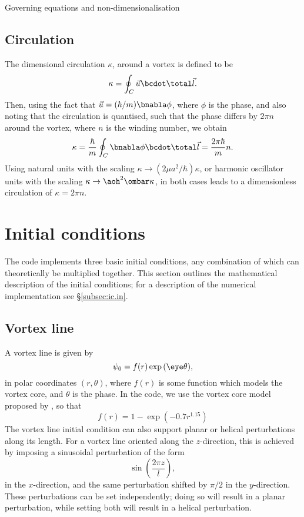 \begin{chapter}{\label{cha:equations}Governing equations and
  non-dimensionalisation}
  \subsection{Circulation}
  The dimensional circulation $\kappa$, around a vortex is defined to be
  \begin{equation*}
    \kappa = \oint_{C}{\vec{u}\bcdot\total\vec{l}}.
  \end{equation*}
  Then, using the fact that $\vec{u} = (\hbar/m)\bnabla\phi$, where $\phi$ is
  the phase, and also noting that the circulation is quantised, such that the
  phase differs by $2\pi n$ around the vortex, where $n$ is the winding number,
  we obtain
  \begin{equation*}
    \kappa = \frac{\hbar}{m} \oint_{C}{\bnabla\phi\bcdot\total\vec{l}} =
    \frac{2\pi\hbar}{m}n.
  \end{equation*}
  Using natural units with the scaling $\kappa \to (2\mu a^{2}/\hbar)\kappa$,
  or harmonic oscillator units with the scaling $\kappa \to
  \aoh^{2}\ombar\kappa$, in both cases leads to a dimensionless circulation of
  $\kappa = 2\pi n$.

  \section{Initial conditions}
  The code implements three basic initial conditions, any combination of which
  can theoretically be multiplied together.  This section outlines the
  mathematical description of the initial conditions; for a description of the
  numerical implementation see \S\ref{subsec:ic.in}.

  \subsection{Vortex line}
  A vortex line is given by
  \begin{equation*}
    \psi_{0} = f(r) \exp{(\eye \theta)},
  \end{equation*}
  in polar coordinates $(r, \theta)$, where $f(r)$ is some function which
  models the vortex core, and $\theta$ is the phase.  In the code, we use the
  vortex core model proposed by \citet{BR01}, so that
  \begin{equation*}
    f(r) = 1 - \exp{\left( -0.7r^{1.15}\right)}
  \end{equation*}
  The vortex line initial condition can also support planar or helical
  perturbations along its length.  For a vortex line oriented along the
  $z$-direction, this is achieved by imposing a sinusoidal
  perturbation of the form
  \begin{equation*}
    \sin{\left( \frac{2\pi z}{l} \right)},
  \end{equation*}
  in the $x$-direction, and the same perturbation shifted by $\pi/2$ in the
  $y$-direction.  These perturbations can be set independently; doing so will
  result in a planar perturbation, while setting both will result in a helical
  perturbation.


\end{chapter}
